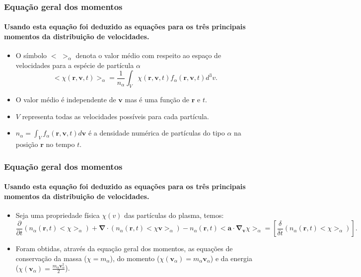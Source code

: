 \documentclass[aspectratio=169]{beamer}
\begin{document}
    \begin{frame}
			\frametitle{Equação geral dos momentos}
		\framesubtitle{Usando esta equação foi deduzido as equações para os três principais momentos da distribuição de velocidades.}
		\begin{itemize}
		\item O símbolo $<$  $>_\alpha$ denota o valor médio com respeito ao espaço de velocidades para a espécie de partícula $\alpha$
		\begin{equation}
<\chi(\bm{r},\bm{v},t)>_\alpha = \frac{1}{n_\alpha} \int_V \chi(\bm{r},\bm{v},t) f_\alpha(\bm{r},\bm{v},t) d^3 v.
\label{anexo1}
\end{equation}
		\item O valor médio é independente de $\bm{v}$ mas é uma função de $\bm{r}$ e $t$.
		\item $V$ representa todas as velocidades possíveis para cada partícula.
		\item $n_\alpha=\int_V{f_\alpha(\bm{r},\bm{v},t)}d\bm{v}$ é a densidade numérica de partículas do tipo $\alpha$ na posição $\bm{r}$ no tempo $t$.
		\end{itemize}


\end{frame}	
    \begin{frame}
			\frametitle{Equação geral dos momentos}
		\framesubtitle{Usando esta equação foi deduzido as equações para os três principais momentos da distribuição de velocidades.}
		\begin{itemize}
		\item Seja uma propriedade física $\chi(v)$ das partículas do plasma, temos:
		\begin{equation}
\label{eq: pit12}
\frac{\partial }{\partial t}(n_\alpha(\bm{r},t)<\chi>_\alpha) +\bm{ \nabla} \cdot (n_\alpha(\bm{r},t)<\chi \bm{v} >_\alpha) - n_\alpha(\bm{r},t)<\bm{a} \cdot \bm{\nabla_v} \chi>_\alpha =[\frac{\delta}{\delta t}(n_\alpha(\bm{r},t)<\chi>_\alpha)].
\end{equation}
		\item Foram obtidas, através da equação geral dos momentos, as equações de conservação da massa ($\chi=m_\alpha$), do momento ($\chi (\bm{v}_\alpha)=m_\alpha \bm{v}_\alpha$) e da energia ($\chi (\bm{v}_\alpha)=\frac{m_\alpha \bm{v}^2_\alpha}{2}$).
		\end{itemize}

\end{frame}	
	
\end{document}

